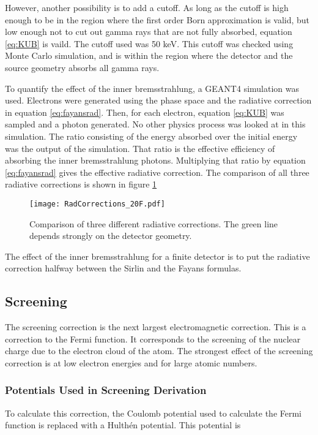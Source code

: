 \documentclass[../MaxHughesThesis.tex]{subfiles}
\begin{document}
However, another possibility is to add a cutoff. 
As long as the cutoff is high enough to be in the region where the first order Born approximation is valid, but low enough not to cut out gamma rays that are not fully absorbed, equation \ref{eq:KUB} is vaild.
The cutoff used was 50 keV.
This cutoff was checked using Monte Carlo simulation, and is within the region where the detector and the source geometry absorbs all gamma rays.

To quantify the effect of the inner bremsstrahlung, a GEANT4 simulation was used.
Electrons were generated using the phase space and the radiative correction in equation \ref{eq:fayansrad}.
Then, for each electron, equation \ref{eq:KUB} was sampled and a photon generated.
No other physics process was looked at in this simulation.
The ratio consisting of the energy absorbed over the initial energy was the output of the simulation.
That ratio is the effective efficiency of absorbing the inner bremsstrahlung photons.
Multiplying that ratio by equation \ref{eq:fayansrad} gives the effective radiative correction.
The comparison of all three radiative corrections is shown in figure \ref{fig:rad}

\begin{figure}[!htb]
	\centerline{\texttt{[image: RadCorrections\_20F.pdf]}}
	\caption{Comparison of three different radiative corrections.
		 The green line depends strongly on the detector geometry.
		 }
	\label{fig:rad}
\end{figure}
The effect of the inner bremsstrahlung for a finite detector is to put the radiative correction halfway between the Sirlin and the Fayans formulas.

\subsection{Screening}
The screening correction is the next largest electromagnetic correction.
This is a correction to the Fermi function.
It corresponds to the screening of the nuclear charge due to the electron cloud of the atom.
The strongest effect of the screening correction is at low electron energies and for large atomic numbers.


\subsubsection{Potentials Used in Screening Derivation}
To calculate this correction, the Coulomb potential used to calculate the Fermi function is replaced with a Hulth\'en potential.
This potential is %
\end{document}
